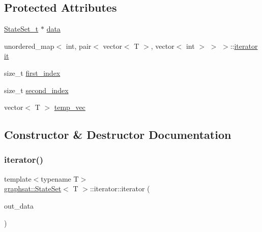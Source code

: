 \subsection*{Protected Attributes}
\begin{DoxyCompactItemize}
\item 
\mbox{\hyperlink{classgraphsat_1_1_state_set_a6474a59203fade7146aacfd0e277ecf4}{State\+Set\+\_\+t}} $\ast$ \mbox{\hyperlink{classgraphsat_1_1_state_set_1_1iterator_a0de5b07e95480dc478026ebfcc894cce}{data}}
\item 
unordered\+\_\+map$<$ int, pair$<$ vector$<$ T $>$, vector$<$ int $>$ $>$ $>$\+::\mbox{\hyperlink{classgraphsat_1_1_state_set_1_1iterator}{iterator}} \mbox{\hyperlink{classgraphsat_1_1_state_set_1_1iterator_a3ef7b91a4d691579cab8bd32ec7c8e64}{it}}
\item 
size\+\_\+t \mbox{\hyperlink{classgraphsat_1_1_state_set_1_1iterator_a9ba6c3cc09d36865506ff941a6d6087b}{first\+\_\+index}}
\item 
size\+\_\+t \mbox{\hyperlink{classgraphsat_1_1_state_set_1_1iterator_afa790382eb861024a46b35739155d0f4}{second\+\_\+index}}
\item 
vector$<$ T $>$ \mbox{\hyperlink{classgraphsat_1_1_state_set_1_1iterator_a1dfd23c465e65432365d802390a3e458}{temp\+\_\+vec}}
\end{DoxyCompactItemize}


\subsection{Constructor \& Destructor Documentation}
\mbox{\label{classgraphsat_1_1_state_set_1_1iterator_adada32d7041adaec91fe4cf4e66bca81}} 
\subsubsection{\texorpdfstring{iterator()}{iterator()}\hspace{0.1cm}{\footnotesize\ttfamily [1/3]}}
{\footnotesize\ttfamily template$<$typename T$>$ \\
\mbox{\hyperlink{classgraphsat_1_1_state_set}{graphsat\+::\+State\+Set}}$<$ T $>$\+::iterator\+::iterator (\begin{DoxyParamCaption}\item[{\mbox{\hyperlink{classgraphsat_1_1_state_set_a6474a59203fade7146aacfd0e277ecf4}{State\+Set\+\_\+t}} $\ast$}]{out\+\_\+data }\end{DoxyParamCaption})\hspace{0.3cm}{\ttfamily [inline]}}

